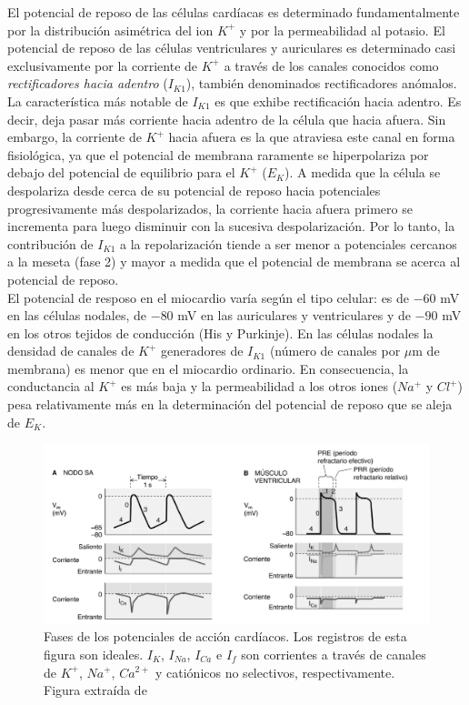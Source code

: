 \begin{itemize}
  El potencial de reposo de las células cardíacas es determinado fundamentalmente por la distribución asimétrica
  del ion $K^+$ y por la permeabilidad al potasio. El potencial de reposo de las células ventriculares y auriculares
  es determinado casi exclusivamente por la corriente de $K^+$ a través de los canales conocidos como
  \textit{rectificadores hacia adentro} ($I_{K1}$), también denominados rectificadores anómalos.
  La característica más notable de $I_{K1}$ es que exhibe rectificación hacia adentro. Es decir, deja pasar más
  corriente hacia adentro de la célula que hacia afuera. Sin embargo, la corriente de $K^+$ hacia afuera es la que
  atraviesa este canal en forma fisiológica, ya que el potencial de membrana raramente se hiperpolariza por debajo
  del potencial de equilibrio para el $K^+$ ($E_K$). A medida que la célula se despolariza desde cerca de su potencial
  de reposo hacia potenciales progresivamente más despolarizados, la corriente hacia afuera primero se incrementa
  para luego disminuir con la sucesiva despolarización. Por lo tanto, la contribución de $I_{K1}$ a la repolarización
  tiende a ser menor a potenciales cercanos a la meseta (fase 2) y mayor a medida que el potencial de membrana
  se acerca al potencial de reposo. \\El potencial de resposo en el miocardio varía según el tipo celular:
  es de $-60$ mV en las células nodales, de $-80$ mV en las auriculares y ventriculares y de $-90$ mV en los otros
  tejidos de conducción (His y Purkinje). En las células nodales la densidad de canales de $K^+$ generadores
  de $I_{K1}$ (número de canales por $\mu$m de membrana) es menor que en el miocardio ordinario. En consecuencia,
  la conductancia al $K^+$ es más baja y la permeabilidad a los otros iones ($Na^+$ y $Cl^+$) pesa relativamente
  más en la determinación del potencial de reposo que se aleja de $E_K$.
\end{itemize}

\begin{figure}[H]
  \centering
  \includegraphics[scale=0.45]{sections/chapter-02/images/action_potential_phases.png}
  \caption[Fases de los potenciales de acción cardíacos.]{Fases de los potenciales de acción cardíacos. Los
  registros de esta figura son ideales. $I_K$, $I_{Na}$, $I_{Ca}$ e $I_f$ son corrientes a través de canales
  de $K^+$, $Na^+$, $Ca^{2+}$ y catiónicos no selectivos, respectivamente. Figura extraída de \cite{bk:boron3ed}}
  \label{fig:action_potential_phases}
\end{figure}

